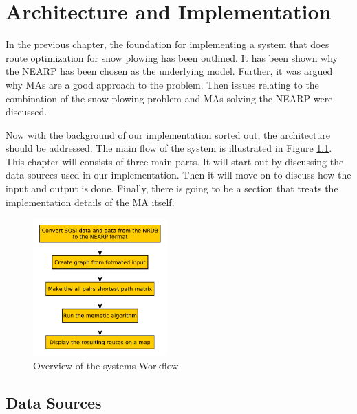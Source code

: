 \chapter{Architecture and Implementation}
\label{architecture_and_implementation}

In the previous chapter, the foundation for implementing a system that does route optimization for snow plowing has been outlined. It has been shown why the NEARP has been chosen as the underlying model. Further, it was argued why MAs are a good approach to the problem. Then issues relating to the combination of the snow plowing problem and MAs solving the NEARP were discussed.

Now with the background of our implementation sorted out, the architecture should be addressed. The main flow of the system is illustrated in Figure \ref{fig:system_flowchart}. This chapter will consists of three main parts. It will start out by discussing the data sources used in our implementation. Then it will move on to discuss how the input and output is done. Finally, there is going to be a section that treats the implementation details of the MA itself.

\begin{figure}
    \begin{center}
        \includegraphics[width=0.46\textwidth]{figures/Architecture/Overal_system_workflow.pdf}
    \end{center}
    \caption{Overview of the systems Workflow}
    \label{fig:system_flowchart}
\end{figure}

\section{Data Sources} %
\label{sec:data_sources}

